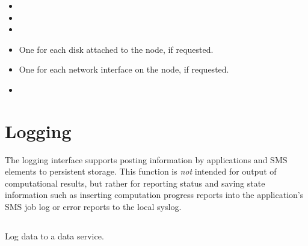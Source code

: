 {\begin{itemize}
{    Memory that once was swapped out, is swapped back in but still also is in the swapfile. In MBytes
    }
    \item {}
    \item {}
    \item {}
    \item {} One for each disk attached to the node, if requested.
    \item {} One for each network interface on the node, if requested.
    \item {}
\end{itemize}
}

\section{Logging}
\label{chap:api_job_mgmt:logging}

The logging interface supports posting information by applications and SMS elements to persistent storage. This function is \textit{not} intended for output of computational results, but rather for reporting status and saving state information such as inserting computation progress reports into the application's \ac{SMS} job log or error reports to the local syslog.

\subsection{}

\summary

Log data to a data service.

